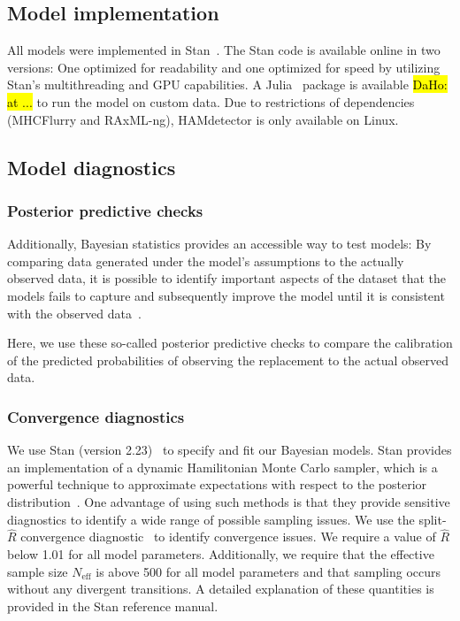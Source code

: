 \documentclass{bioinfo}
\begin{document}
\begin{methods}
\subsection{Model implementation}
All models were implemented in Stan~\citep{Stan2021}. The Stan code is available online in two versions: One optimized for readability and one optimized for speed by utilizing Stan's multithreading and GPU capabilities.
A Julia~\citep{Bezanson2017} package is available \hl{DaHo: at ...} to run the model on custom data. Due to restrictions of dependencies (MHCFlurry and RAxML-ng), HAMdetector is only available on Linux. %


  \subsection{Model diagnostics}

  \subsubsection{Posterior predictive checks}

  Additionally, Bayesian statistics provides an accessible way to test models: By comparing data generated under the model's assumptions to the actually observed data, it is possible to identify important aspects of the dataset that the models fails to capture and subsequently improve the model until it is consistent with the observed data~\cite{Gabry2019}.

  Here, we use these so-called posterior predictive checks to compare the calibration of the predicted probabilities of observing the replacement to the actual observed data. 

  \subsubsection{Convergence diagnostics}

  We use Stan (version 2.23)~\cite{Stan2021} to specify and fit our Bayesian models.
  Stan provides an implementation of a dynamic Hamilitonian Monte Carlo sampler, which is a powerful technique to approximate expectations with respect to the posterior distribution~\cite{Betancourt2017}. One advantage of using such methods is that they provide sensitive diagnostics to identify a wide range of possible sampling issues.
  We use the split-\(\hat{R}\) convergence diagnostic~\cite{Gelman1992} to identify convergence issues. We require a value of \(\hat{R}\) below 1.01 for all model parameters. Additionally, we require that the effective sample size \(N_{\text{eff}}\) is above 500 for all model parameters and that sampling occurs without any divergent transitions. A detailed explanation of these quantities is provided in the Stan reference manual.


\end{methods}
\end{document}
